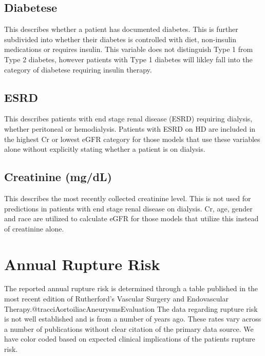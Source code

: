 \documentclass[
]{book}
\begin{document}
\hypertarget{diabetese}{%
\subsection{Diabetese}\label{diabetese}}

This describes whether a patient has documented diabetes. This is further subdivided into whether their diabetes is controlled with diet, non-insulin medications or requires insulin. This variable does not distinguish Type 1 from Type 2 diabetes, however patients with Type 1 diabetes will likley fall into the category of diabetese requiring insulin therapy.

\hypertarget{esrd}{%
\subsection{ESRD}\label{esrd}}

This describes patients with end stage renal disease (ESRD) requiring dialysis, whether peritoneal or hemodialysis. Patients with ESRD on HD are included in the highest Cr or lowest eGFR category for those models that use these variables alone without explicitly stating whether a patient is on dialysis.

\hypertarget{creatinine-mgdl}{%
\subsection{Creatinine (mg/dL)}\label{creatinine-mgdl}}

This describes the most recently collected creatinine level. This is not used for predictions in patients with end stage renal disease on dialysis. Cr, age, gender and race are utilized to calculate eGFR for those models that utilize this instead of creatinine alone.

\hypertarget{annual-rupture-risk}{%
\section{Annual Rupture Risk}\label{annual-rupture-risk}}

The reported annual rupture risk is determined through a table published in the most recent edition of Rutherford's Vascular Surgery and Endovascular Therapy.@tracciAortoiliacAneurysmsEvaluation The data regarding rupture risk is not well established and is from a number of years ago. These rates vary across a number of publications without clear citation of the primary data source. We have color coded based on expected clinical implications of the patients rupture risk.
\end{document}
